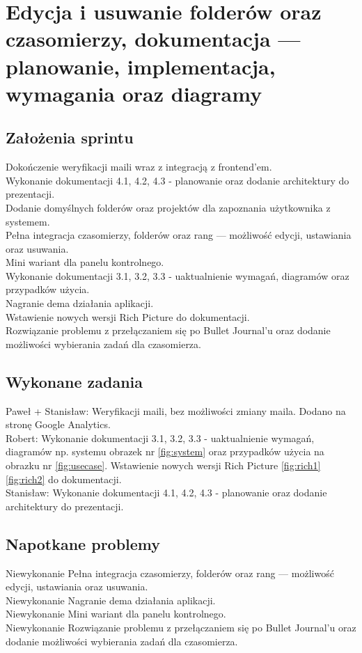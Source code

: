 \documentclass[a4paper,11pt]{report}
\begin{document}
\section {Edycja i usuwanie folderów oraz czasomierzy, dokumentacja — planowanie, implementacja, wymagania oraz diagramy}
\label{sec:system_sesji_pracy}
\subsection {Założenia sprintu}
Dokończenie weryfikacji maili wraz z integracją z frontend'em.\\
Wykonanie dokumentacji 4.1, 4.2, 4.3 - planowanie oraz dodanie architektury do prezentacji.\\
Dodanie domyślnych folderów oraz projektów dla zapoznania użytkownika z systemem.\\
Pełna integracja czasomierzy, folderów oraz rang — możliwość edycji, ustawiania oraz usuwania.\\
Mini wariant dla panelu kontrolnego.\\
Wykonanie dokumentacji 3.1, 3.2, 3.3 - uaktualnienie wymagań, diagramów oraz przypadków użycia.\\
Nagranie dema działania aplikacji.\\
Wstawienie nowych wersji Rich Picture do dokumentacji.\\
Rozwiązanie problemu z przełączaniem się po Bullet Journal'u oraz dodanie możliwości wybierania zadań dla czasomierza.\\
\subsection {Wykonane zadania}
Paweł + Stanisław: Weryfikacji maili, bez możliwości zmiany maila. Dodano na stronę Google Analytics.\\
Robert: Wykonanie dokumentacji 3.1, 3.2, 3.3 - uaktualnienie wymagań, diagramów np. systemu obrazek nr \ref{fig:system} oraz przypadków użycia na obrazku nr \ref{fig:usecase}. Wstawienie nowych wersji Rich Picture \ref{fig:rich1} \ref{fig:rich2} do dokumentacji.\\
Stanisław: Wykonanie dokumentacji 4.1, 4.2, 4.3 - planowanie oraz dodanie architektury do prezentacji.\\
\subsection {Napotkane problemy}
Niewykonanie Pełna integracja czasomierzy, folderów oraz rang — możliwość edycji, ustawiania oraz usuwania.\\
Niewykonanie Nagranie dema działania aplikacji.\\
Niewykonanie Mini wariant dla panelu kontrolnego.\\
Niewykonanie Rozwiązanie problemu z przełączaniem się po Bullet Journal'u oraz dodanie możliwości wybierania zadań dla czasomierza.\\
\end{document}

